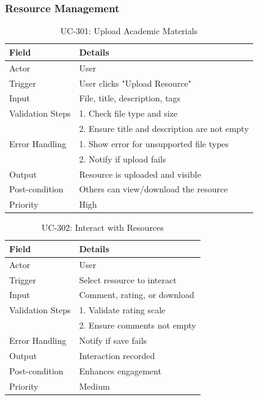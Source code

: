 \subsubsection{Resource Management}
\begin{table}[H]
\centering
\caption{UC-301: Upload Academic Materials}
\begin{tabular}{|l|p{10cm}|}
\hline
\textbf{Field} & \textbf{Details} \\ \hline
Actor & User \\ \hline
Trigger & User clicks "Upload Resource" \\ \hline
Input & File, title, description, tags \\ \hline
Validation Steps & 1. Check file type and size \\ 
                 & 2. Ensure title and description are not empty \\ \hline
Error Handling & 1. Show error for unsupported file types \\ 
               & 2. Notify if upload fails \\ \hline
Output & Resource is uploaded and visible \\ \hline
Post-condition & Others can view/download the resource \\ \hline
Priority & High \\ \hline
\end{tabular}
\end{table}

\begin{table}[H]
\centering
\caption{UC-302: Interact with Resources}
\begin{tabular}{|l|p{10cm}|}
\hline
\textbf{Field} & \textbf{Details} \\ \hline
Actor & User \\ \hline
Trigger & Select resource to interact \\ \hline
Input & Comment, rating, or download \\ \hline
Validation Steps & 1. Validate rating scale \\ 
                 & 2. Ensure comments not empty \\ \hline
Error Handling & Notify if save fails \\ \hline
Output & Interaction recorded \\ \hline
Post-condition & Enhances engagement \\ \hline
Priority & Medium \\ \hline
\end{tabular}
\end{table}


